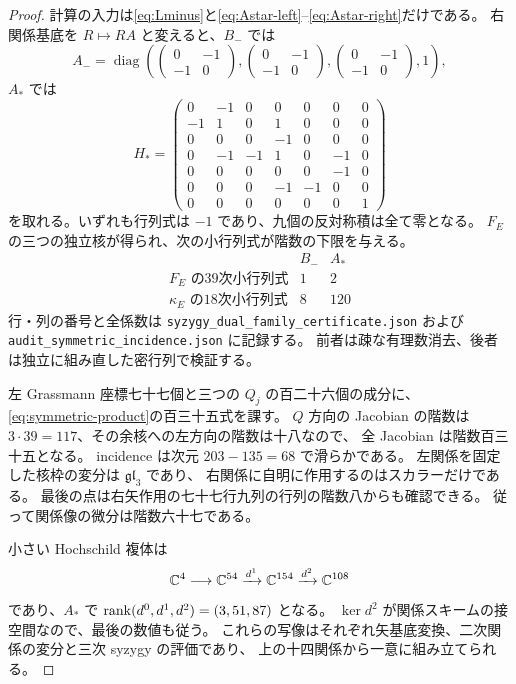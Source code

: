 \begin{proof}
計算の入力は\eqref{eq:Lminus}と\eqref{eq:Astar-left}--\eqref{eq:Astar-right}だけである。
右関係基底を $R\mapsto RA$ と変えると、$B_-$ では
\[
 A_-=\operatorname{diag}\left(
 \begin{pmatrix}0&-1\\-1&0\end{pmatrix},
 \begin{pmatrix}0&-1\\-1&0\end{pmatrix},
 \begin{pmatrix}0&-1\\-1&0\end{pmatrix},1\right),
\]
$A_*$ では
\[
 H_*=\begin{pmatrix}
0&-1&0&0&0&0&0\\-1&1&0&1&0&0&0\\0&0&0&-1&0&0&0\\
0&-1&-1&1&0&-1&0\\0&0&0&0&0&-1&0\\0&0&0&-1&-1&0&0\\0&0&0&0&0&0&1
\end{pmatrix}
\]
を取れる。いずれも行列式は $-1$ であり、九個の反対称積は全て零となる。
$F_E$ の三つの独立核が得られ、次の小行列式が階数の下限を与える。
\[
\begin{array}{c|rr}
 & B_-&A_*\\\hline
F_E\text{ の39次小行列式}&1&2\\
\kappa_E\text{ の18次小行列式}&8&120
\end{array}
\]
行・列の番号と全係数は
\nolinkurl{syzygy_dual_family_certificate.json} および
\nolinkurl{audit_symmetric_incidence.json} に記録する。
前者は疎な有理数消去、後者は独立に組み直した密行列で検証する。

左 Grassmann 座標七十七個と三つの $Q_j$ の百二十六個の成分に、
\eqref{eq:symmetric-product}の百三十五式を課す。
$Q$ 方向の Jacobian の階数は $3\cdot39=117$、その余核への左方向の階数は十八なので、
全 Jacobian は階数百三十五となる。
incidence は次元 $203-135=68$ で滑らかである。
左関係を固定した核枠の変分は $\mathfrak{gl}_3$ であり、
右関係に自明に作用するのはスカラーだけである。
最後の点は右矢作用の七十七行九列の行列の階数八からも確認できる。
従って関係像の微分は階数六十七である。

小さい Hochschild 複体は
\[
 \mathbb C^4\longrightarrow\mathbb C^{54}\xrightarrow{d^1}\mathbb C^{154}
 \xrightarrow{d^2}\mathbb C^{108}
\]
であり、$A_*$ で $\operatorname{rank}(d^0,d^1,d^2)=(3,51,87)$ となる。
$\ker d^2$ が関係スキームの接空間なので、最後の数値も従う。
これらの写像はそれぞれ矢基底変換、二次関係の変分と三次 syzygy の評価であり、
上の十四関係から一意に組み立てられる。
\end{proof}

